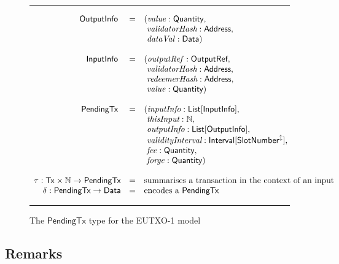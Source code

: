 \documentclass[a4paper]{article}
\renewcommand{\i}{\textit}  %
\newcommand{\s}{\textsf}  %
\newcommand{\msf}[1]{\ensuremath{\mathsf{#1}}}
\newcommand{\mi}[1]{\ensuremath{\mathit{#1}}}
\newcommand\rfskip{7pt}
\newenvironment{ruledfigure}[1]{\begin{figure}[#1]\hrule\vspace{\rfskip}}{\vspace{\rfskip}\hrule\end{figure}}
\newcommand{\List}[1]{\ensuremath{\s{List}[#1]}}
\newcommand{\Interval}[1]{\ensuremath{\s{Interval}[#1]}}
\newcommand{\extended}[1]{#1^\updownarrow}
\newcommand{\ptx}{\ensuremath{\s{PendingTx}}}
\newcommand{\Address}{\ensuremath{\s{Address}}}
\newcommand{\forge}{\mi{forge}}
\newcommand{\fee}{\mi{fee}}
\newcommand{\val}{\mi{value}}  %
\newcommand{\dataval}{\mi{dataVal}}
\newcommand{\Data}{\ensuremath{\s{Data}}}
\newcommand{\outputref}{\mi{outputRef}}
\newcommand{\slotnum}{\ensuremath{\s{SlotNumber}}}
\newcommand{\eutxotx}{\msf{Tx}}
\newcommand{\qty}{\ensuremath{\s{Quantity}}}
\newcommand\N{\ensuremath{\mathbb{N}}}
\begin{document}
\begin{ruledfigure}{H}
  \begin{displaymath}
  \begin{array}{rll}
    \s{OutputInfo } &=&(\val: \qty,\\
                    & &\ \i{validatorHash}: \Address,\\
                    & &\ \dataval: \Data)\\
    \\
    \s{InputInfo } &=&(\outputref: \s{OutputRef},\\
                   & &\ \i{validatorHash}: \s{Address},\\
                   & &\ \i{redeemerHash}: \s{Address},\\
                   & &\ \val: \qty)\\
     \\
     \ptx\s{ } &=&(\i{inputInfo}: \List{\s{InputInfo}},\\
               & &\ \i{thisInput}: \N,\\
               & &\ \i{outputInfo}: \List{\s{OutputInfo}},\\
               & &\ \i{validityInterval}: \Interval{\extended{\slotnum}},\\
               & &\ \fee: \qty,\\
               & &\ \forge: \qty)\\
     \\
     \tau: \eutxotx \times \N \rightarrow \ptx &=& \mbox{summarises a transaction in the context of an input}\\
     \delta: \ptx \rightarrow \Data &=& \mbox{encodes a \ptx{}}
  \end{array}
  \end{displaymath}
  \caption{The \ptx{} type for the EUTXO-1 model}
  \label{fig:ptx-1-types}
\end{ruledfigure}

\subsection{Remarks}
\end{document}
